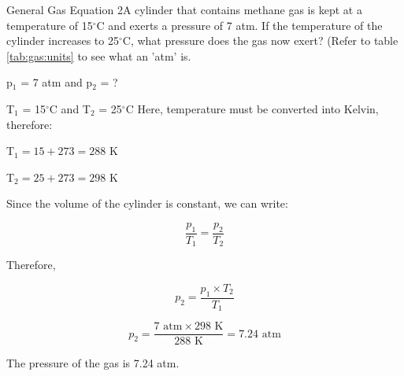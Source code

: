 \begin{wex}{General Gas Equation 2}{A cylinder that contains methane gas is kept at a temperature of 15$^{\circ}$C and exerts a pressure of 7 atm. If the temperature of the cylinder increases to 25$^{\circ}$C, what pressure does the gas now exert? (Refer to table \ref{tab:gas:units} to see what an 'atm' is.}{

p$_{1}$ = 7 atm and p$_{2}$ = ?

T$_{1}$ = 15$^{\circ}$C and T$_{2}$ = 25$^{\circ}$C
Here, temperature must be converted into Kelvin, therefore:

T$_{1} = 15 + 273 = 288$ K

T$_{2} = 25 + 273 = 298$ K

Since the volume of the cylinder is constant, we can write:

\begin{equation*}
\frac{p_{1}}{T_{1}} = \frac{p_{2}}{T_{2}}
\end{equation*}

Therefore,

\begin{equation*}
p_{2} = \frac{p_{1} \times T_{2}}{T_{1}}
\end{equation*}

\begin{equation*}
p_{2} = \frac{7 \text{ atm} \times 298 \text{ K}}{288 \text{ K}} = 7.24 \text{ atm}
\end{equation*}

The pressure of the gas is 7.24 atm.
}
\end{wex}

